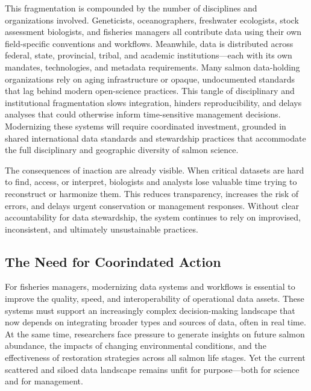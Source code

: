 \documentclass[
  letterpaper,
  DIV=11,
  numbers=noendperiod]{scrartcl}
\begin{document}
This fragmentation is compounded by the number of disciplines and
organizations involved. Geneticists, oceanographers, freshwater
ecologists, stock assessment biologists, and fisheries managers all
contribute data using their own field-specific conventions and
workflows. Meanwhile, data is distributed across federal, state,
provincial, tribal, and academic institutions---each with its own
mandates, technologies, and metadata requirements. Many salmon
data-holding organizations rely on aging infrastructure or opaque,
undocumented standards that lag behind modern open-science practices.
This tangle of disciplinary and institutional fragmentation slows
integration, hinders reproducibility, and delays analyses that could
otherwise inform time-sensitive management decisions. Modernizing these
systems will require coordinated investment, grounded in shared
international data standards and stewardship practices that accommodate
the full disciplinary and geographic diversity of salmon science.

The consequences of inaction are already visible. When critical datasets
are hard to find, access, or interpret, biologists and analysts lose
valuable time trying to reconstruct or harmonize them. This reduces
transparency, increases the risk of errors, and delays urgent
conservation or management responses. Without clear accountability for
data stewardship, the system continues to rely on improvised,
inconsistent, and ultimately unsustainable practices.

\subsection{The Need for Coorindated
Action}\label{the-need-for-coorindated-action}

For fisheries managers, modernizing data systems and workflows is
essential to improve the quality, speed, and interoperability of
operational data assets. These systems must support an increasingly
complex decision-making landscape that now depends on integrating
broader types and sources of data, often in real time. At the same time,
researchers face pressure to generate insights on future salmon
abundance, the impacts of changing environmental conditions, and the
effectiveness of restoration strategies across all salmon life stages.
Yet the current scattered and siloed data landscape remains unfit for
purpose---both for science and for management.
\end{document}
